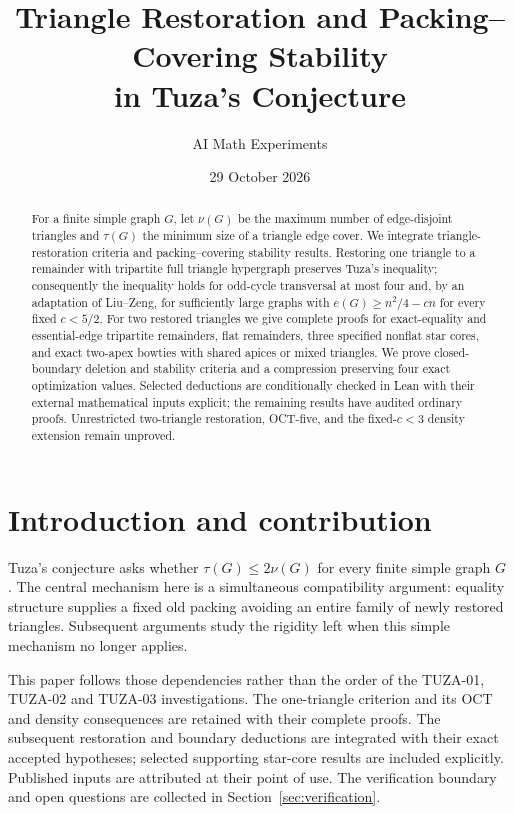 \documentclass[11pt]{article}
\title{Triangle Restoration and Packing--Covering Stability\\in Tuza's Conjecture}
\author{AI Math Experiments}
\date{29 October 2026}
\theoremstyle{definition}\newtheorem{definition}[theorem]{Definition}
\theoremstyle{remark}\newtheorem{remark}[theorem]{Remark}
\begin{document}
\maketitle
\begin{abstract}
For a finite simple graph $G$, let $\nu(G)$ be the maximum number of edge-disjoint triangles and $\tau(G)$ the minimum size of a triangle edge cover. We integrate triangle-restoration criteria and packing--covering stability results. Restoring one triangle to a remainder with tripartite full triangle hypergraph preserves Tuza's inequality; consequently the inequality holds for odd-cycle transversal at most four and, by an adaptation of Liu--Zeng, for sufficiently large graphs with $e(G)\ge n^2/4-cn$ for every fixed $c<5/2$. For two restored triangles we give complete proofs for exact-equality and essential-edge tripartite remainders, flat remainders, three specified nonflat star cores, and exact two-apex bowties with shared apices or mixed triangles. We prove closed-boundary deletion and stability criteria and a compression preserving four exact optimization values. Selected deductions are conditionally checked in Lean with their external mathematical inputs explicit; the remaining results have audited ordinary proofs. Unrestricted two-triangle restoration, OCT-five, and the fixed-$c<3$ density extension remain unproved.
\end{abstract}
\tableofcontents
\section{Introduction and contribution}
Tuza's conjecture asks whether $\tau(G)\le2\nu(G)$ for every finite simple graph $G$ \cite{Tuza}. The central mechanism here is a simultaneous compatibility argument: equality structure supplies a fixed old packing avoiding an entire family of newly restored triangles. Subsequent arguments study the rigidity left when this simple mechanism no longer applies.

This paper follows those dependencies rather than the order of the TUZA-01, TUZA-02 and TUZA-03 investigations. The one-triangle criterion and its OCT and density consequences are retained with their complete proofs. The subsequent restoration and boundary deductions are integrated with their exact accepted hypotheses; selected supporting star-core results are included explicitly. Published inputs are attributed at their point of use. The verification boundary and open questions are collected in Section~\ref{sec:verification}.
\end{document}
